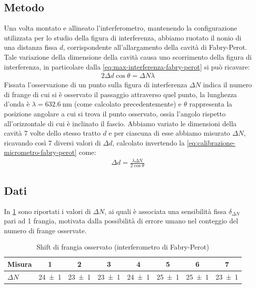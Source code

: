 \documentclass[a4paper]{article}
\begin{document}
\subsection{Metodo}
Una volta montato e allineato l'interferometro, mantenendo la configurazione utilizzata per lo studio della figura di interferenza, abbiamo ruotato il 
nonio di una distanza fissa $d$, corrispondente all'allargamento della cavità di Fabry-Perot. Tale variazione della dimensione della cavità causa uno
scorrimento della figura di interferenza, in particolare dalla \cref{eq:max-interferenza-fabry-perot} si può ricavare:
\begin{align}
    2 \Delta d \cos  \theta = \Delta N \lambda
\label{eq:calibrazione-micrometro-fabry-perot}
\end{align}
Fissata l'osservazione di un punto sulla figura di interferenza $\Delta N$ indica il numero di frange di cui si è osservato il passaggio attraverso quel punto, la lunghezza d'onda è $\lambda = \SI{632.6}{\nano\meter}$ (come calcolato precedentemente) e $\theta$ rappresenta la posizione angolare a cui si trova il punto osservato, ossia l'angolo rispetto all'orizzontale di cui è inclinato il fascio.
Abbiamo variato le dimensioni della cavità 7 volte dello stesso tratto $d$ e per ciascuna di esse abbiamo misurato $\Delta N$, ricavando così 7 diversi valori di $\Delta d$, calcolato invertendo la \cref{eq:calibrazione-micrometro-fabry-perot} come:
\begin{align}
    \Delta d = \frac{\lambda \Delta N}{2\cos{\theta}}
\label{eq:calibrazione-micrometro-fabry-perot-invertita}
\end{align}

\subsection{Dati}
In \cref{tab:micrometro-fabry-perot} sono riportati i valori di $\Delta N$, ai quali è associata una sensibilità fissa $\delta_{\Delta N}$ pari ad 1 frangia, motivata dalla possibilità di errore umano nel conteggio del numero di frange osservate.

\begin{table}[htbp]
\centering
\caption{Shift di frangia osservato (interferometro di Fabry-Perot)}
\begin{tabular}{|l|ccccccc|}
\hline
Misura & 1 & 2 & 3 & 4 & 5 & 6 & 7 \\\hline\hline
$\Delta N$ & \num{24 \pm 1} & \num{23 \pm 1} & \num{23 \pm 1} & \num{24 \pm 1} & \num{25 \pm 1} & \num{25 \pm 1} & \num{23 \pm 1} \\\hline
\end{tabular}
\label{tab:micrometro-fabry-perot}
\end{table}
\end{document}
